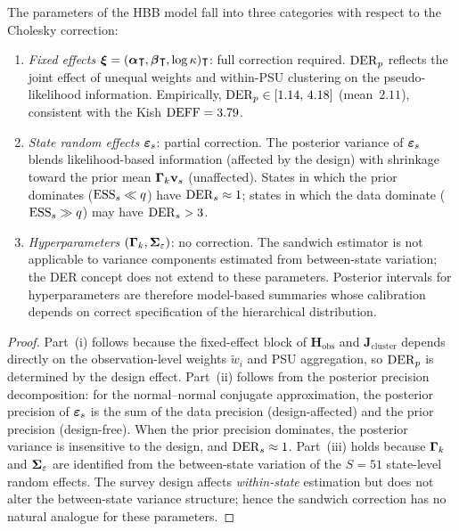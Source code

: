 \begin{proposition}
\label{smc:prop-der-classification}
  The parameters of the HBB model fall into three categories with
  respect to the Cholesky correction\textup{:}
  \begin{enumerate}[label=\textup{(\roman*)},nosep]
    \item \emph{Fixed effects}
      $\boldsymbol{\xi}
      = (\boldsymbol{\alpha}\intercal,\boldsymbol{\beta}\intercal,\log\kappa)\intercal$\textup{:}
      full correction required.  $\operatorname{DER}_p$ reflects the joint effect of
      unequal weights and within-PSU clustering on the pseudo-likelihood
      information.  Empirically, $\operatorname{DER}_p \in [1.14,\,4.18]$
      (mean~$2.11$), consistent with the Kish $\text{DEFF} = 3.79$.

    \item \emph{State random effects}
      $\boldsymbol{\varepsilon}_s$\textup{:} partial correction.
      The posterior variance of $\boldsymbol{\varepsilon}_s$ blends
      likelihood-based information (affected by the design) with
      shrinkage toward the prior mean $\boldsymbol{\Gamma}_k\mathbf{v}_s$ (unaffected).
      States in which the prior dominates ($\text{ESS}_s \ll q$) have
      $\operatorname{DER}_s \approx 1$; states in which the data dominate
      ($\text{ESS}_s \gg q$) may have $\operatorname{DER}_s > 3$.

    \item \emph{Hyperparameters}
      $(\boldsymbol{\Gamma}_k, \boldsymbol{\Sigma}_\varepsilon)$\textup{:} no correction.
      The sandwich estimator is not applicable to variance components
      estimated from between-state variation; the DER concept does not
      extend to these parameters. Posterior intervals for
      hyperparameters are therefore model-based summaries whose
      calibration depends on correct specification of the hierarchical
      distribution.
  \end{enumerate}
\end{proposition}

\begin{proof}
  Part~(i) follows because the fixed-effect block of
  $\mathbf{H}_{\mathrm{obs}}$ and $\mathbf{J}_{\mathrm{cluster}}$
  depends directly on the observation-level weights $\tilde{w}_i$ and
  PSU aggregation, so $\operatorname{DER}_p$ is determined by the design effect.
  Part~(ii) follows from the posterior precision decomposition: for
  the normal--normal conjugate approximation, the posterior precision
  of $\boldsymbol{\varepsilon}_s$ is the sum of the data precision (design-affected)
  and the prior precision (design-free).  When the prior precision
  dominates, the posterior variance is insensitive to the design, and
  $\operatorname{DER}_s \approx 1$.
  Part~(iii) holds because $\boldsymbol{\Gamma}_k$ and $\boldsymbol{\Sigma}_\varepsilon$ are
  identified from the between-state variation of the $S = 51$
  state-level random effects.  The survey design affects
  \emph{within-state} estimation but does not alter the between-state
  variance structure; hence the sandwich correction has no natural
  analogue for these parameters.
\end{proof}

